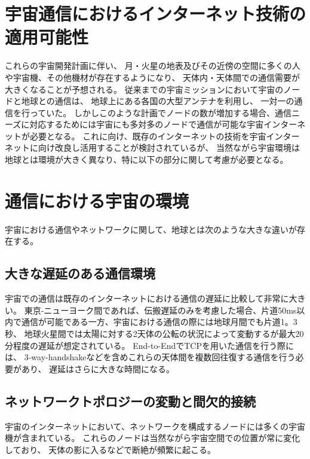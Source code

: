 \section{宇宙通信におけるインターネット技術の適用可能性}
\label{section:宇宙通信におけるインターネット技術の適用性}
これらの宇宙開発計画に伴い、 月・火星の地表及びその近傍の空間に多くの人や宇宙機、その他機材が存在するようになり、
天体内・天体間での通信需要が大きくなることが予想される。 
従来までの宇宙ミッションにおいて宇宙のノードと地球との通信は、 地球上にある各国の大型アンテナを利用し、 一対一の通信を行っていた。
しかしこのような計画でノードの数が増加する場合、通信ニーズに対応するためには宇宙にも多対多のノードで通信が可能な宇宙インターネットが必要となる。 
これに向け、既存のインターネットの技術を宇宙インターネットに向け改良し活用することが検討されているが、
当然ながら宇宙環境は地球とは環境が大きく異なり、特に以下の部分に関して考慮が必要となる。

\section{通信における宇宙の環境}
\label{section:通信における宇宙の環境}
宇宙における通信やネットワークに関して、地球とは次のような大きな違いが存在する。


\subsection{大きな遅延のある通信環境}
\label{subsection:大きな遅延のある通信環境}
宇宙での通信は既存のインターネットにおける通信の遅延に比較して非常に大きい。
東京-ニューヨーク間であれば、伝搬遅延のみを考慮した場合、片道50ms以内で通信が可能である一方、宇宙における通信の際には地球月間でも片道1。3秒、
地球火星間では太陽に対する2天体の公転の状況によって変動するが最大20分程度の遅延が想定されている。
End-to-EndでTCPを用いた通信を行う際には、 3-way-handshakeなどを含めこれらの天体間を複数回往復する通信を行う必要があり、 
遅延はさらに大きな時間になる。 
\cite{McBrayer2022}


\subsection{ネットワークトポロジーの変動と間欠的接続}
\label{subsection:ネットワークトポロジーの変動と間欠的接続}
宇宙のインターネットにおいて、ネットワークを構成するノードには多くの宇宙機が含まれている。
これらのノードは当然ながら宇宙空間での位置が常に変化しており、
 天体の影に入るなどで断絶が頻繁に起こる。 

